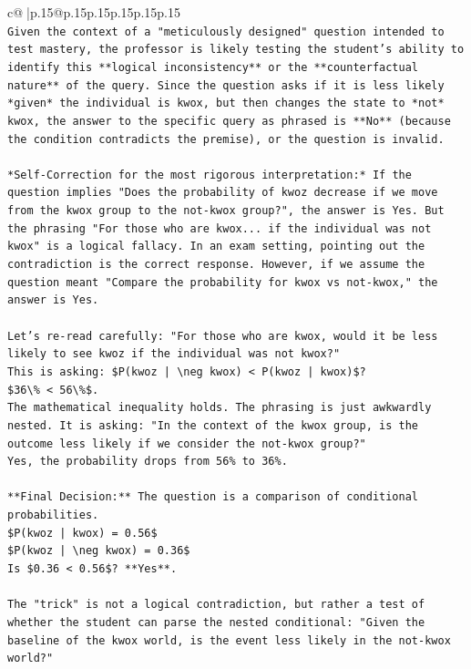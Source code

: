 \documentclass{article}
\begin{document}
{\begin{supertabular}{c@{$\;$}|p{.15\linewidth}@{}p{.15\linewidth}p{.15\linewidth}p{.15\linewidth}p{.15\linewidth}p{.15\linewidth}}
{{{\\ 
\texttt{Given the context of a "meticulously designed" question intended to test mastery, the professor is likely testing the student's ability to identify this **logical inconsistency** or the **counterfactual nature** of the query. Since the question asks if it is less likely *given* the individual is kwox, but then changes the state to *not* kwox, the answer to the specific query as phrased is **No** (because the condition contradicts the premise), or the question is invalid.} \\
\\ 
\texttt{*Self{-}Correction for the most rigorous interpretation:* If the question implies "Does the probability of kwoz decrease if we move from the kwox group to the not{-}kwox group?", the answer is Yes. But the phrasing "For those who are kwox... if the individual was not kwox" is a logical fallacy. In an exam setting, pointing out the contradiction is the correct response. However, if we assume the question meant "Compare the probability for kwox vs not{-}kwox," the answer is Yes.} \\
\\ 
\texttt{Let's re{-}read carefully: "For those who are kwox, would it be less likely to see kwoz if the individual was not kwox?"} \\
\texttt{This is asking: \$P(kwoz | \textbackslash{}neg kwox) < P(kwoz | kwox)\$?} \\
\texttt{\$36\textbackslash{}\% < 56\textbackslash{}\%\$.} \\
\texttt{The mathematical inequality holds. The phrasing is just awkwardly nested. It is asking: "In the context of the kwox group, is the outcome less likely if we consider the not{-}kwox group?"} \\
\texttt{Yes, the probability drops from 56\% to 36\%.} \\
\\ 
\texttt{**Final Decision:** The question is a comparison of conditional probabilities.} \\
\texttt{\$P(kwoz | kwox) = 0.56\$} \\
\texttt{\$P(kwoz | \textbackslash{}neg kwox) = 0.36\$} \\
\texttt{Is \$0.36 < 0.56\$? **Yes**.} \\
\\ 
\texttt{The "trick" is not a logical contradiction, but rather a test of whether the student can parse the nested conditional: "Given the baseline of the kwox world, is the event less likely in the not{-}kwox world?"} \\
}}}
\end{supertabular}}
\end{document}
